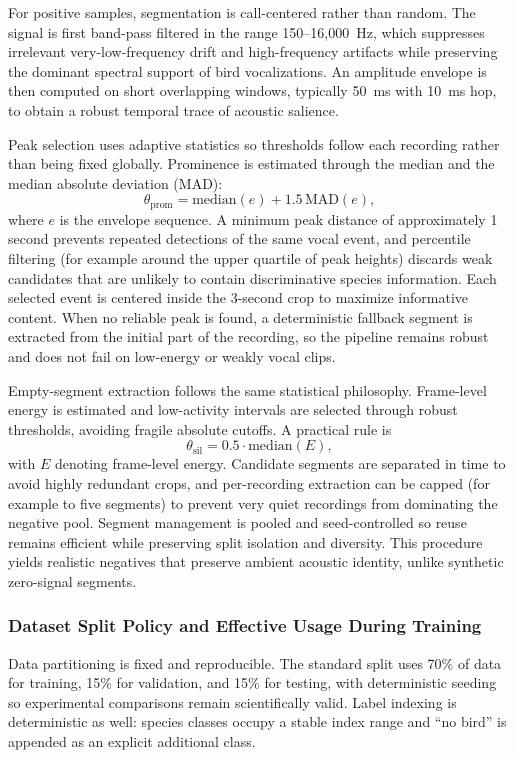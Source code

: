 \documentclass[a4paper,singleside,12pt]{report} %
\begin{document}
	For positive samples, segmentation is call-centered rather than random. The signal is first band-pass filtered in the range 150--16,000~Hz, which suppresses irrelevant very-low-frequency drift and high-frequency artifacts while preserving the dominant spectral support of bird vocalizations. An amplitude envelope is then computed on short overlapping windows, typically 50~ms with 10~ms hop, to obtain a robust temporal trace of acoustic salience.

	Peak selection uses adaptive statistics so thresholds follow each recording rather than being fixed globally. Prominence is estimated through the median and the median absolute deviation (MAD):
	\begin{equation}
		\theta_{\mathrm{prom}} = \mathrm{median}(e) + 1.5\,\mathrm{MAD}(e),
	\end{equation}
	where \(e\) is the envelope sequence. A minimum peak distance of approximately 1 second prevents repeated detections of the same vocal event, and percentile filtering (for example around the upper quartile of peak heights) discards weak candidates that are unlikely to contain discriminative species information. Each selected event is centered inside the 3-second crop to maximize informative content. When no reliable peak is found, a deterministic fallback segment is extracted from the initial part of the recording, so the pipeline remains robust and does not fail on low-energy or weakly vocal clips.

	Empty-segment extraction follows the same statistical philosophy. Frame-level energy is estimated and low-activity intervals are selected through robust thresholds, avoiding fragile absolute cutoffs. A practical rule is
	\begin{equation}
		\theta_{\mathrm{sil}} = 0.5 \cdot \mathrm{median}(E),
	\end{equation}
	with \(E\) denoting frame-level energy. Candidate segments are separated in time to avoid highly redundant crops, and per-recording extraction can be capped (for example to five segments) to prevent very quiet recordings from dominating the negative pool. Segment management is pooled and seed-controlled so reuse remains efficient while preserving split isolation and diversity. This procedure yields realistic negatives that preserve ambient acoustic identity, unlike synthetic zero-signal segments.

	\subsubsection{Dataset Split Policy and Effective Usage During Training}
	Data partitioning is fixed and reproducible. The standard split uses 70\% of data for training, 15\% for validation, and 15\% for testing, with deterministic seeding so experimental comparisons remain scientifically valid. Label indexing is deterministic as well: species classes occupy a stable index range and ``no bird'' is appended as an explicit additional class.
\end{document}
